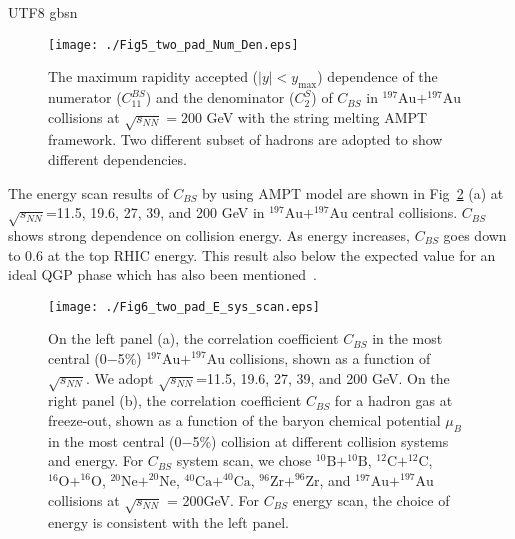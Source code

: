 \documentclass[twocolumn,showpacs,preprintnumbers,superscriptaddress,amsmath,amssymb]{revtex4}
\begin{document}
\begin{CJK*} {UTF8} {gbsn}
				\begin{figure}[htb]
				\texttt{[image: ./Fig5\_two\_pad\_Num\_Den.eps]}
				\caption{
				The maximum rapidity accepted ($|y|<y_{\text{max}}$) dependence of the numerator ($C_{11}^{BS}$) and the denominator ($C_{2}^{S}$) of $C_{BS}$
				in $\mathrm{^{197}Au+^{197}Au}$ collisions at $\sqrt{s_{NN}} = 200$ GeV with the string melting AMPT framework.
				Two different subset of hadrons are adopted to show different dependencies.
				}
				\label{Fig5_Num_Den}
	\end{figure}
	
	\par
	The energy scan results of $C_{BS}$ by using AMPT model are shown in Fig~\ref{Fig6_E_sys_mub} (a) at $\sqrt{s_{NN}}$=11.5, 19.6, 27, 39, and 200 GeV in $\mathrm{^{197}Au+^{197}Au}$ central collisions.
	$C_{BS}$ shows strong dependence on collision energy.
	As energy increases, $C_{BS}$ goes down to 0.6 at the top RHIC energy.
	This result also below the expected value for an ideal QGP phase which has also been mentioned~\cite{Haussler_2007}.
	
	\begin{figure}[htb]
				\texttt{[image: ./Fig6\_two\_pad\_E\_sys\_scan.eps]}
				\caption{
				On the left panel (a), the correlation coefficient $C_{BS}$ in the most central (0$-$5\%) $\mathrm{^{197}Au+^{197}Au}$ collisions, shown as a function of $\sqrt{s_{NN}}$.
				We adopt $\sqrt{s_{NN}}$=11.5, 19.6, 27, 39, and 200 GeV.
				On the right panel (b), the correlation coefficient $C_{BS}$ for a hadron gas at freeze-out, shown as a function of the baryon chemical potential $\mu_{B}$ in the most central (0$-$5\%) collision at different collision systems and energy.
				For $C_{BS}$ system scan, we chose
				 $\mathrm{^{10}B+^{10}B}$, $\mathrm{^{12}C+^{12}C}$, $\mathrm{^{16}O+^{16}O}$, $\mathrm{^{20}Ne+^{20}Ne}$, $\mathrm{^{40}Ca+^{40}Ca}$, $\mathrm{^{96}Zr+^{96}Zr}$, and $\mathrm{^{197}Au+^{197}Au}$ collisions at $\sqrt{s_{NN}}$ = 200GeV.
				 For $C_{BS}$ energy scan, the choice of energy is consistent with the left panel.
				}
				\label{Fig6_E_sys_mub}
	\end{figure}
		

\end{CJK*}
\end{document}
